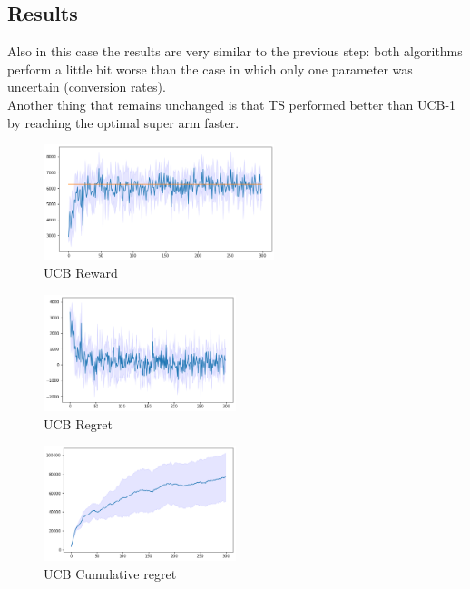 \subsection{Results}
Also in this case the results are very similar to the previous step: both algorithms perform a little bit worse than the case in which only one parameter was uncertain (conversion rates).\\ Another thing that remains unchanged is that TS performed better than UCB-1 by reaching the optimal super arm faster.
\begin{figure}[ht]
    \begin{center}
    \includegraphics[width=0.6\textwidth]{img/ucb_reward5.png}
    \caption{UCB Reward}
    \label{fig:reward51}
    \end{center}
\end{figure}
\begin{multicols}{2}
    \begin{figure}[H]
        \begin{center}
        \includegraphics[width=0.5\textwidth]{img/ucb_regret5.png}
        \caption{UCB Regret}
        \label{fig:regret51}
        \end{center}
    \end{figure}
    \columnbreak
    \begin{figure}[H]
        \begin{center}
        \includegraphics[width=0.5\textwidth]{img/ucb_cum_regret5.png}
        \caption{UCB Cumulative regret}
        \label{fig:cum_reg51}
        \end{center}
    \end{figure}
\end{multicols}

